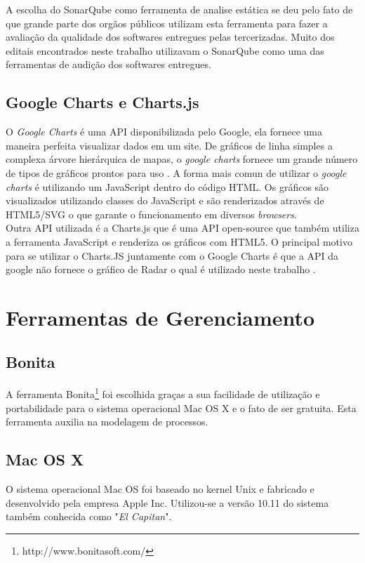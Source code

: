A escolha do SonarQube como ferramenta de analise estática se deu pelo fato de que grande parte dos orgãos públicos utilizam esta ferramenta para fazer a avaliação da qualidade dos softwares entregues pelas tercerizadas. Muito dos editais encontrados neste trabalho utilizavam o SonarQube como uma das ferramentas de audição dos softwares entregues.

	
	\subsection{Google Charts e Charts.js}
	\label{sub:google_charts_chartsjs}
	O \textit{Google Charts} é uma API disponibilizada pelo Google, ela fornece uma maneira perfeita visualizar dados em um site. De gráficos de linha simples a complexa árvore hierárquica de mapas, o \textit{google charts} fornece um grande número de tipos de gráficos prontos para uso \cite{google_charts}. A forma mais comun de utilizar o \textit{google charts} é utilizando um JavaScript dentro do código HTML. Os gráficos são visualizados utilizando classes do JavaScript e são renderizados através de HTML5/SVG o que garante o funcionamento em diversos \textit{browsers}. 
	\\Outra API utilizada é a Charts.js que é uma API open-source que também utiliza a ferramenta JavaScript e renderiza os gráficos com HTML5. O principal motivo para se utilizar o Charts.JS juntamente com o Google Charts é que a API da google não fornece o gráfico de Radar o qual é utilizado neste trabalho \cite{chartsjs}.
	
\section{Ferramentas de Gerenciamento}

	\subsection{Bonita} %
	\label{sub:Bonita}
		 A ferramenta Bonita\footnote{http://www.bonitasoft.com/} foi escolhida graças a sua facilidade de utilização e portabilidade para o sistema operacional Mac OS X e o fato de ser gratuita. Esta ferramenta auxilia na modelagem de processos.

	\subsection{Mac OS X} %
	\label{sub:Mac OS X}
		O sistema operacional Mac OS foi baseado no kernel Unix e fabricado e desenvolvido pela empresa Apple Inc. Utilizou-se a versão 10.11 do sistema também conhecida como "\textit{El Capitan}".

